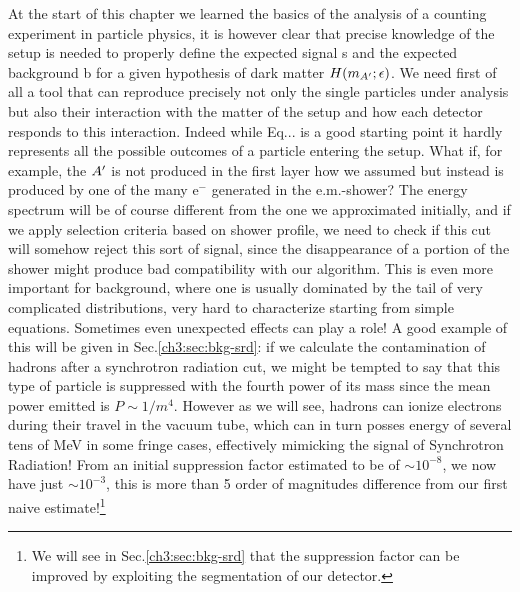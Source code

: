 At the start of this chapter we learned the basics of the analysis of a counting experiment in particle physics, it is however clear that precise knowledge of the setup is needed to properly define the expected signal s and the expected background b for a given hypothesis of dark matter $H(m_{A'};\epsilon)$. We need first of all a tool that can reproduce precisely not only the single particles under analysis but also their interaction with the matter of the setup and how each detector responds to this interaction. Indeed while Eq... is a good starting point it hardly represents all the possible outcomes of a particle entering the setup. What if, for example, the $A'$ is not produced in the first layer how we assumed but instead is produced by one of the many e$^-$ generated in the e.m.-shower? The energy spectrum will be of course different from the one we approximated initially, and if we apply selection criteria based on shower profile, we need to check if this cut will somehow reject this sort of signal, since the disappearance of a portion of the shower might produce bad compatibility with our algorithm. This is even more important for background, where one is usually dominated by the tail of very complicated distributions, very hard to characterize starting from simple equations. Sometimes even unexpected effects can play a role! A good example of this will be given in Sec.\ref{ch3:sec:bkg-srd}: if we calculate the contamination of hadrons after a synchrotron radiation cut, we might be tempted to say that this type of particle is suppressed with the fourth power of its mass since the mean power emitted is $P \sim 1/m^4$. However as we will see, hadrons can ionize electrons during their travel in the vacuum tube, which can in turn posses energy of several tens of MeV in some fringe cases, effectively mimicking the signal of Synchrotron Radiation! From an initial suppression factor estimated to be of $\sim 10^{-8}$, we now have just $\sim 10^{-3}$, this is more than 5 order of magnitudes difference from our first naive estimate!\footnote{We will see in Sec.\ref{ch3:sec:bkg-srd} that the suppression factor can be improved by exploiting the segmentation of our detector.}

